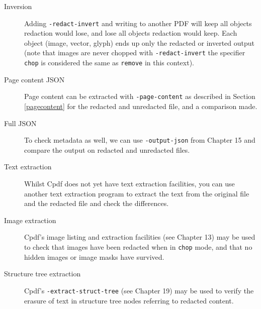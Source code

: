 \documentclass{book}
\begin{document}
\begin{description}
\item[Inversion] Adding \texttt{-redact-invert} and writing to another PDF will keep all objects redaction would lose, and lose all objects redaction would keep. Each object (image, vector, glyph) ends up only the redacted or inverted output (note that images are never chopped with \texttt{-redact-invert} the specifier \texttt{chop} is considered the same as  \texttt{remove} in this context).
\item[Page content JSON] Page content can be extracted with \texttt{-page-content} as described in Section \ref{pagecontent} for the redacted and unredacted file, and a comparison made.
\item[Full JSON] To check metadata as well, we can use \texttt{-output-json} from Chapter 15 and compare the output on redacted and unredacted files.
\item[Text extraction] Whilst Cpdf does not yet have text extraction facilities, you can use another text extraction program to extract the text from the original file and the redacted file and check the differences.
\item[Image extraction] Cpdf's image listing and extraction facilities (see Chapter 13) may be used to check that images have been redacted when in \texttt{chop} mode, and that no hidden images or image masks have survived.
\item[Structure tree extraction] Cpdf's \texttt{-extract-struct-tree} (see Chapter 19) may be used to verify the erasure of text in  structure tree nodes referring to redacted content.
\end{description}

\clearpage\pagestyle{empty}
\end{document}
